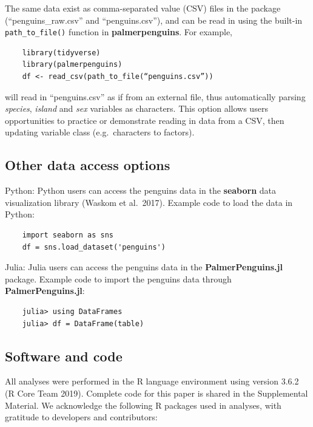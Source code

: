 The same data exist as comma-separated value (CSV) files in the package (``penguins\_raw.csv'' and ``penguins.csv''), and can be read in using the built-in \texttt{path\_to\_file()} function in \textbf{palmerpenguins}. For example,

\begin{verbatim}
    library(tidyverse)
    library(palmerpenguins)
    df <- read_csv(path_to_file(“penguins.csv”))
\end{verbatim}

will read in ``penguins.csv'' as if from an external file, thus automatically parsing \emph{species}, \emph{island} and \emph{sex} variables as characters. This option allows users opportunities to practice or demonstrate reading in data from a CSV, then updating variable class (e.g.~characters to factors).

\hypertarget{other-data-access-options}{%
\subsection{Other data access options}\label{other-data-access-options}}

Python: Python users can access the penguins data in the \textbf{seaborn} data visualization library (Waskom et al.~2017). Example code to load the data in Python:

\begin{verbatim}
    import seaborn as sns
    df = sns.load_dataset('penguins') 
\end{verbatim}

Julia: Julia users can access the penguins data in the \textbf{PalmerPenguins.jl} package. Example code to import the penguins data through \textbf{PalmerPenguins.jl}:

\begin{verbatim}
    julia> using DataFrames
    julia> df = DataFrame(table)
\end{verbatim}

\hypertarget{software-and-code}{%
\subsection{Software and code}\label{software-and-code}}

All analyses were performed in the R language environment using version 3.6.2 (R Core Team 2019). Complete code for this paper is shared in the Supplemental Material. We acknowledge the following R packages used in analyses, with gratitude to developers and contributors:

